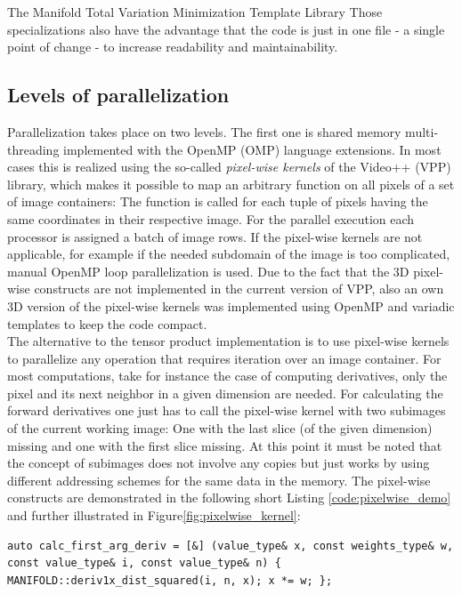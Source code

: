 \begin{chapter}{The Manifold Total Variation Minimization Template Library}
Those specializations also have the advantage that the code is just in one file - a single point of change - to increase readability and maintainability.


\subsection{Levels of parallelization} %
\label{sub:Levels of parallelization}
Parallelization takes place on two levels. The first one is shared memory multi-threading implemented with the OpenMP (OMP) language extensions. In most cases this is realized 
using the so-called \textit{pixel-wise kernels} of the Video++ (VPP) library, which makes it possible to map an arbitrary function on all pixels of a set of image containers: The function is
called for each tuple of pixels having the same coordinates in their respective image. For the parallel execution each processor is assigned a batch of image rows.
If the pixel-wise kernels are not applicable, for example if the needed subdomain of the image is too complicated, manual OpenMP loop parallelization is used. Due to the fact that the 3D pixel-wise constructs are not 
implemented in the current version of VPP, also an own 3D version of the pixel-wise kernels 
was implemented using OpenMP and variadic templates to keep the code compact.\\

The alternative to the tensor product implementation is to use pixel-wise kernels to parallelize any operation that requires iteration over an image container.
For most computations, take for instance the case of computing derivatives, only the pixel and its next neighbor in a given dimension are needed. For calculating the forward derivatives one just has to call the pixel-wise kernel with two subimages of the current working image: One with the last slice (of the given dimension) missing and one with the first slice missing. At this point it must be noted that the concept of subimages does not
involve any copies but just works by using different addressing schemes for the same
data in the memory.
The pixel-wise constructs are demonstrated in the following short Listing \ref{code:pixelwise_demo} and further illustrated in Figure\ref{fig:pixelwise_kernel}:\\

\cppinline
\begin{lstlisting}[label=code:pixelwise_demo,caption={Pixel-wise forward derivative computation}]
auto calc_first_arg_deriv = [&] (value_type& x, const weights_type& w, const value_type& i, const value_type& n) { MANIFOLD::deriv1x_dist_squared(i, n, x); x *= w; }; 


\end{lstlisting}
\end{chapter}
